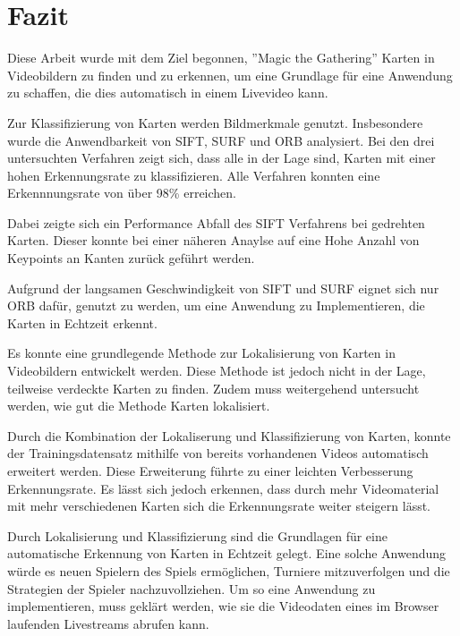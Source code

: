 \section{Fazit}\raggedbottom 

Diese Arbeit wurde mit dem Ziel begonnen, ''Magic the Gathering'' Karten in Videobildern zu finden und zu erkennen, um eine Grundlage für eine Anwendung zu schaffen, die dies automatisch in einem Livevideo kann. 

Zur Klassifizierung von Karten werden Bildmerkmale genutzt. Insbesondere wurde die Anwendbarkeit von SIFT, SURF und ORB analysiert.
Bei den drei untersuchten Verfahren zeigt sich, dass alle in der Lage sind, Karten mit einer hohen Erkennungsrate zu klassifizieren. Alle Verfahren konnten eine Erkennnungsrate von über 98\% erreichen.

Dabei zeigte sich ein Performance Abfall des SIFT Verfahrens bei gedrehten Karten. Dieser konnte bei einer näheren Anaylse auf eine Hohe Anzahl von Keypoints an Kanten zurück geführt werden. 

Aufgrund der langsamen Geschwindigkeit von SIFT und SURF eignet sich nur ORB dafür, genutzt zu werden, um eine Anwendung zu Implementieren, die Karten in Echtzeit erkennt.

Es konnte eine grundlegende Methode zur Lokalisierung von Karten in Videobildern entwickelt werden. Diese Methode ist jedoch nicht in der Lage, teilweise verdeckte Karten zu finden. Zudem muss weitergehend untersucht werden, wie gut die Methode Karten lokalisiert.

Durch die Kombination der Lokaliserung und Klassifizierung von Karten, konnte der Trainingsdatensatz mithilfe von bereits vorhandenen Videos automatisch erweitert werden. Diese Erweiterung führte zu einer leichten Verbesserung Erkennungsrate. Es lässt sich jedoch erkennen, dass durch mehr Videomaterial mit mehr verschiedenen Karten sich die Erkennungsrate weiter steigern lässt.

Durch Lokalisierung und Klassifizierung sind die Grundlagen für eine automatische Erkennung von Karten in Echtzeit gelegt. Eine solche Anwendung würde es neuen Spielern des Spiels ermöglichen, Turniere mitzuverfolgen und die Strategien der Spieler nachzuvollziehen.
Um so eine Anwendung zu implementieren, muss geklärt werden, wie sie die Videodaten eines im Browser laufenden Livestreams abrufen kann. 
